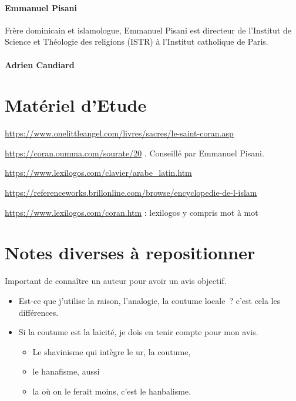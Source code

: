 \paragraph{Emmanuel Pisani}
Frère dominicain et islamologue, Emmanuel Pisani est directeur de l’Institut de Science et Théologie des religions (ISTR) à l’Institut catholique de Paris.

\paragraph{Adrien Candiard}



\section{Matériel d'Etude}\label{matuxe9riel}

\url{https://www.onelittleangel.com/livres/sacres/le-saint-coran.asp}

\url{https://coran.oumma.com/sourate/20} . Conseillé par Emmanuel
Pisani.

\url{https://www.lexilogos.com/clavier/arabe_latin.htm}

\url{https://referenceworks.brillonline.com/browse/encyclopedie-de-l-islam}

\url{https://www.lexilogos.com/coran.htm} : lexilogos y compris mot à
mot




\section{Notes diverses à repositionner}







Important de connaître un auteur pour avoir un avis objectif.





\begin{itemize}
\
  
\item
  Est-ce que j'utilise la raison, l'analogie, la coutume locale~? c'est
  cela les différences.
\item
  Si la coutume est la laicité, je dois en tenir compte pour mon avis.

  \begin{itemize}
  \item
    Le shavinisme qui intègre le ur, la coutume,
  \item
    le hanafisme, aussi~
  \item
    la où on le ferait moins, c'est le hanbalisme.
  \end{itemize}
\end{itemize}



